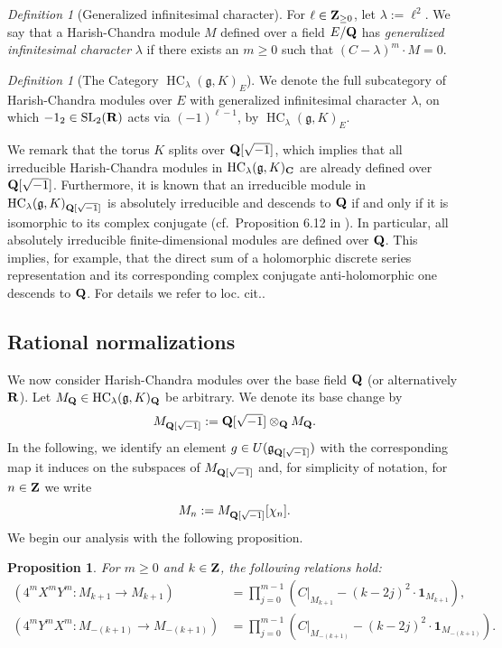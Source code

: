 \documentclass[a4paper,12pt,reqno]{amsart}
\newcommand{\CC}{{\rm\bf C}}
\newcommand{\RR}{{\rm\bf R}}
\newcommand{\QQ}{{\rm\bf Q}}
\newcommand{\ZZ}{{\rm\bf Z}}
\DeclareMathOperator{\SL}{\mathrm{SL}}
\DeclareMathOperator{\HC}{\mathrm{HC}}
\theoremstyle{plain}
\newtheorem{proposition}[theorem]{Proposition}
\theoremstyle{remark}
\newtheorem{definition}[theorem]{Definition}
\begin{document}
  \begin{definition}[Generalized infinitesimal character]
    For $\ell \in \ZZ_{\ge 0}$, let $\lambda := \ell^2$. We say that a Harish-Chandra module $M$ defined over a field $E/\QQ$ has \emph{generalized infinitesimal character} $\lambda$ if there exists an $m\ge 0$ such that $(C-\lambda)^m \cdot M = 0$.
  \end{definition}

  \begin{definition}[The Category $\HC_\lambda(\mathfrak{g}, K)_E$]
    We denote the full subcategory of Harish-Chandra modules over $E$ with generalized infinitesimal character $\lambda$, on which $-1_2 \in \SL_2(\RR)$ acts via $(-1)^{\ell-1}$, by $\HC_\lambda(\mathfrak{g}, K)_E$.
  \end{definition}
  
  We remark that the torus $K$ splits over $\QQ[\sqrt{-1}]$, which implies that all irreducible Harish-Chandra modules in $\HC_\lambda(\mathfrak{g}, K)_\CC$ are already defined over $\QQ[\sqrt{-1}]$. Furthermore, it is known that an irreducible module in $\HC_\lambda(\mathfrak{g}, K)_{\QQ[\sqrt{-1}]}$ is absolutely irreducible and descends to $\QQ$ if and only if it is isomorphic to its complex conjugate (cf.\ Proposition 6.12 in \cite{Januszewski18}). In particular, all absolutely irreducible finite-dimensional modules are defined over $\QQ$. This implies, for example, that the direct sum of a holomorphic discrete series representation and its corresponding complex conjugate anti-holomorphic one descends to $\QQ$. For details we refer to loc. cit..
  
\subsection{Rational normalizations}

  We now consider Harish-Chandra modules over the base field $\QQ$ (or alternatively $\RR$). Let $M_\QQ \in \HC_\lambda(\mathfrak{g}, K)_\QQ$ be arbitrary. We denote its base change by
  \[
  M_{\QQ[\sqrt{-1}]} := \QQ[\sqrt{-1}] \otimes_\QQ M_\QQ.
  \]
  In the following, we identify an element $g \in U(\mathfrak{g}_{\QQ[\sqrt{-1}]})$ with the corresponding map it induces on the subspaces of $M_{\QQ[\sqrt{-1}]}$ and, for simplicity of notation, for $n\in\ZZ$ we write
  \[
  M_n := M_{\QQ[\sqrt{-1}]}[\chi_n].
  \]
  We begin our analysis with the following proposition.
  \begin{proposition}\label{prop:XY_C_relation}
    For $m\ge 0$ and $k\in\ZZ$, the following relations hold:
    \begin{align}
      \left(4^m X^m Y^m \colon M_{k+1} \to M_{k+1}\right) &= \prod_{j=0}^{m-1} \left(C|_{M_{k+1}} - (k-2j)^2 \cdot \mathbf{1}_{M_{k+1}}\right), \label{eq:XYm_via_C} \\
      \left(4^m Y^m X^m \colon M_{-(k+1)} \to M_{-(k+1)}\right) &= \prod_{j=0}^{m-1} \left(C|_{M_{-(k+1)}} - (k-2j)^2 \cdot \mathbf{1}_{M_{-(k+1)}}\right). \label{eq:YXm_via_C}
    \end{align}
  \end{proposition}
  
\end{document}
